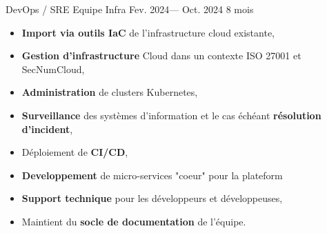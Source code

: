 \jobposition%
{DevOps / SRE}%
{Equipe Infra}%
{Fev. 2024--- Oct. 2024}%
{8 mois}%
{
	\begin{itemize}
	  \item \textbf{Import via outils IaC} de l'infrastructure cloud existante,
		\item \textbf{Gestion d'infrastructure} Cloud dans un contexte ISO 27001 et
		      SecNumCloud,
		\item \textbf{Administration} de clusters Kubernetes,
		\item \textbf{Surveillance} des systèmes d'information et le cas échéant
		      \textbf{résolution d'incident},
		\item Déploiement de \textbf{CI/CD},
		\item \textbf{Developpement} de micro-services "coeur" pour la plateform
		\item \textbf{Support technique} pour les développeurs et développeuses,
		\item Maintient du \textbf{socle de documentation} de l'équipe.
	\end{itemize}
}
